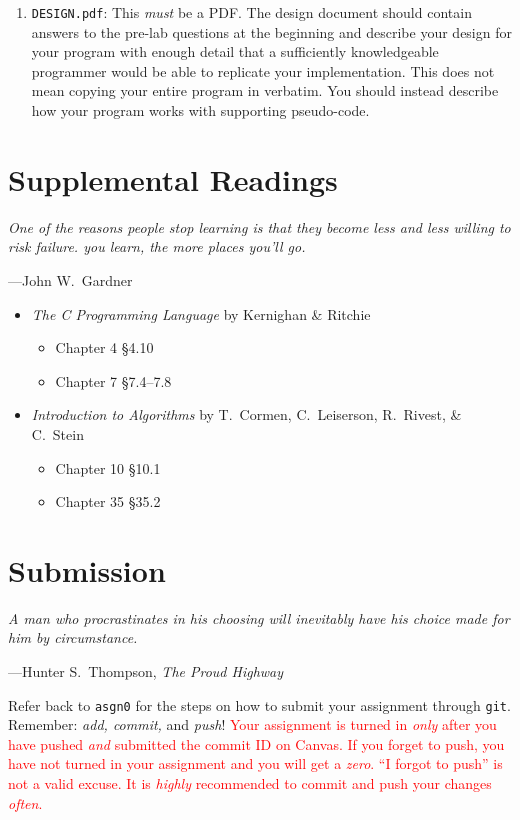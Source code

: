\documentclass[11pt]{article}
\begin{document}
\begin{enumerate}
  \item \texttt{DESIGN.pdf}: This \emph{must} be a PDF. The design
    document should contain answers to the pre-lab questions at the
    beginning and describe your design for your program with enough
    detail that a sufficiently knowledgeable programmer would be able to
    replicate your implementation. This does not mean copying your
    entire program in verbatim. You should instead describe how your
    program works with supporting pseudo-code.

\end{enumerate}

\section{Supplemental Readings}

\epigraph{\emph{One of the reasons people stop learning is that they
become less and less willing to risk failure.  you learn, the more
places you'll go.}}{---John W.\ Gardner}

\begin{itemize}
  \item \textit{The C Programming Language} by Kernighan \& Ritchie
  \begin{itemize}
    \item Chapter 4 \S 4.10
    \item Chapter 7 \S 7.4--7.8
  \end{itemize}
  \item \textit{Introduction to Algorithms} by T.\ Cormen, C.\
    Leiserson, R.\ Rivest, \& C.\ Stein
    \begin{itemize}
      \item Chapter 10 \S 10.1
      \item Chapter 35 \S 35.2
    \end{itemize}
\end{itemize}

\section{Submission}

\epigraph{\emph{A man who procrastinates in his choosing will inevitably
have his choice made for him by circumstance.}}{---Hunter S.\
Thompson, \emph{The Proud Highway}}

Refer back to \texttt{asgn0} for the steps on how to submit your
assignment through \texttt{git}. Remember: \emph{add, commit,} and
\emph{push}! \textcolor{red}{Your assignment is turned in \emph{only}
  after you have pushed \emph{and} submitted the commit ID on Canvas. If
you forget to push, you have not turned in your assignment and you will
get a \emph{zero}. ``I forgot to push'' is not a valid excuse. It is
\emph{highly} recommended to commit and push your changes \emph{often}.}
\end{document}
